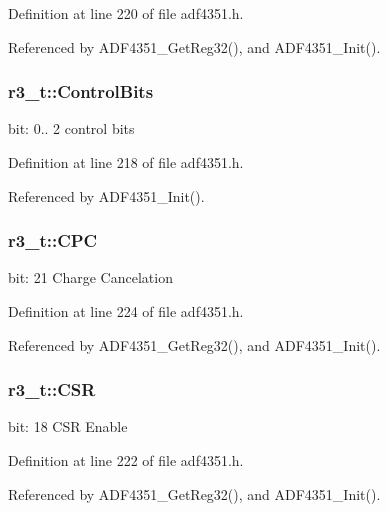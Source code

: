Definition at line 220 of file adf4351.\+h.



Referenced by A\+D\+F4351\+\_\+\+Get\+Reg32(), and A\+D\+F4351\+\_\+\+Init().

\subsubsection[{\texorpdfstring{Control\+Bits}{ControlBits}}]{ r3\+\_\+t\+::\+Control\+Bits}\hypertarget{structr3__t_a4d5d480a6e629c07e0bb5575fb0023bb}{}\label{structr3__t_a4d5d480a6e629c07e0bb5575fb0023bb}
bit\+: 0.. 2 control bits 

Definition at line 218 of file adf4351.\+h.



Referenced by A\+D\+F4351\+\_\+\+Init().

\subsubsection[{\texorpdfstring{C\+PC}{CPC}}]{ r3\+\_\+t\+::\+C\+PC}\hypertarget{structr3__t_a61a4e7b02af2c11e18e823eac349fabf}{}\label{structr3__t_a61a4e7b02af2c11e18e823eac349fabf}
bit\+: 21 Charge Cancelation 

Definition at line 224 of file adf4351.\+h.



Referenced by A\+D\+F4351\+\_\+\+Get\+Reg32(), and A\+D\+F4351\+\_\+\+Init().

\subsubsection[{\texorpdfstring{C\+SR}{CSR}}]{ r3\+\_\+t\+::\+C\+SR}\hypertarget{structr3__t_a295a90a5720da8b88db8bf1420c806e2}{}\label{structr3__t_a295a90a5720da8b88db8bf1420c806e2}
bit\+: 18 C\+SR Enable 

Definition at line 222 of file adf4351.\+h.



Referenced by A\+D\+F4351\+\_\+\+Get\+Reg32(), and A\+D\+F4351\+\_\+\+Init().

